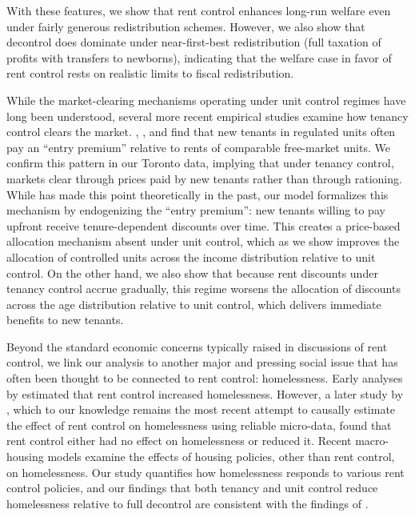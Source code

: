 \documentclass[parskip=full]{article}
\begin{document}
With these features, we show that rent control enhances long-run welfare even under fairly generous redistribution schemes. However, we also show that decontrol does dominate under near-first-best redistribution (full taxation of profits with transfers to newborns), indicating that the welfare case in favor of rent control rests on realistic limits to fiscal redistribution.

While the market-clearing mechanisms operating under unit control regimes have long been understood, several more recent empirical studies examine how tenancy control clears the market. \citet{nagy-1997}, \citet{early-2000}, and \citet{cjq-2023} find that new tenants in regulated units often pay an ``entry premium'' relative to rents of comparable free-market units. We confirm this pattern in our Toronto data, implying that under tenancy control, markets clear through prices paid by new tenants rather than through rationing. While \citet{arnott-1995} has made this point theoretically in the past, our model formalizes this mechanism by endogenizing the ``entry premium'': new tenants willing to pay upfront receive tenure-dependent discounts over time. This creates a price-based allocation mechanism absent under unit control, which as we show improves the allocation of controlled units across the income distribution relative to unit control. On the other hand, we also show that because rent discounts under tenancy control accrue gradually, this regime worsens the allocation of discounts across the age distribution relative to unit control, which delivers immediate benefits to new tenants.

Beyond the standard economic concerns typically raised in discussions of rent control, we link our analysis to another major and pressing social issue that has often been thought to be connected to rent control: homelessness. Early analyses by \citet{tucker1987,tucker1989heritage,tucker1991cato,tucker1991public} estimated that rent control increased homelessness. However, a later study by \citet{eo-1998}, which to our knowledge remains the most recent attempt to causally estimate the effect of rent control on homelessness using reliable micro-data, found that rent control either had no effect on homelessness or reduced it. Recent macro-housing models \citep{az-2024, abramson-2024} examine the effects of housing policies, other than rent control, on homelessness. Our study quantifies how homelessness responds to various rent control policies, and our findings that both tenancy and unit control reduce homelessness relative to full decontrol are consistent with the findings of \citet{eo-1998}. 
\end{document}
